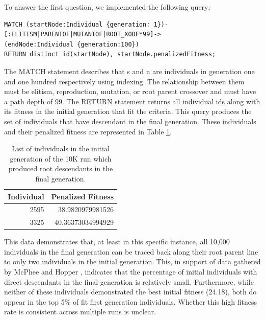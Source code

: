\documentclass[12pt]{article}
\begin{document}
To answer the first question, we implemented the following query:

\begin{verbatim}
MATCH (startNode:Individual {generation: 1})-
[:ELITISM|PARENTOF|MUTANTOF|ROOT_XOOF*99]->
(endNode:Individual {generation:100})
RETURN distinct id(startNode), startNode.penalizedFitness;
\end{verbatim}

The MATCH statement describes that s and n are individuals in generation one and one hundred respectively using indexing. The relationship between them must be elitism, reproduction, mutation, or root parent crossover and must have a path depth of 99. The RETURN statement returns all individual ids along with its fitness in the initial generation that fit the criteria. This query produces the set of individuals that have descendant in the final generation. These individuals and their penalized fitness are represented in Table \ref{tab:descendantsTable}.
\begin{table}[tb]
\begin{center}
\begin{tabular}{|r|r|}
    \hline
    \textbf{Individual} & \textbf{Penalized Fitness} \\ \hline
    2595 & 38.9820979981526 \\
    3325 & 40.36373034994929 \\
    \hline
\end{tabular}
\caption{List of individuals in the initial generation of the 10K run which produced root descendants in the final generation.}
\label{tab:descendantsTable}
\end{center}
\end{table}

This data demonstrates that, at least in this specific instance, all 10,000 individuals in the final generation can be traced back along their root parent line to only two individuals in the initial generation. This, in support of data gathered by McPhee and Hopper \cite{mcphee1999analysis}, indicates that the percentage of initial individuals with direct descendants in the final generation is relatively small. Furthermore, while neither of these individuals demonstrated the best initial fitness (24.18), both do appear in the top 5\% of fit first generation individuals. Whether this high fitness rate is consistent across multiple runs is unclear.
\end{document}
